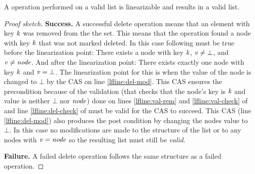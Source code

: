 \begin{lemma}
\label{lemma:delete-linlf}
A  operation performed on a valid list is linearizable and results in a valid list.
\end{lemma}
\begin{proof}[Proof sketch]
{\bf Success.} A successful delete operation means that an element with key $\ms{k}$
was removed from the the set.
This means that the operation found a node with key $\ms{k}$ that was not marked deleted.
In this case following must be true before the linearization point:
There exists a node with key $\ms{k}$, $\ms{v} \neq \bot$, and $\ms{v \neq node}$.
And after the linearization point:
There exists exactly one node with key $\ms{k}$ and $\ms{v} = \bot$.
The linearization point for this is when the value of the node is changed to $\bot$ by the CAS on line
\ref{lfline:del-mod}.
This CAS ensures the precondition because of the validation (that checks that the node's key is $\ms{k}$ and value is neither $\bot$ nor $\ms{node}$)
done on lines \ref{lfline:val-rem} and \ref{lfline:val-check} of 
and line \ref{lfline:del-check} of  must be valid for the CAS to succeed.
This CAS (line \ref{lfline:del-mod}) also produces the post condition by changing the nodes value to $\bot$.
In this case no modifications are made to the structure of the list or to any nodes with $\ms{v = node}$ so the resulting list must still be \emph{valid}.

{\bf Failure.} A failed delete operation follows the same structure as a
failed  operation.
\end{proof}

% 
% 

